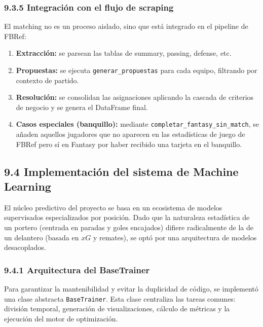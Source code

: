 \subsubsection{9.3.5 Integración con el flujo de scraping}
 
El matching no es un proceso aislado, sino que está integrado en el pipeline de FBRef:
 
\begin{enumerate}
\item \textbf{Extracción:} se parsean las tablas de summary, passing, defense, etc.
 
\item \textbf{Propuestas:} se ejecuta \texttt{generar\_propuestas} para cada equipo, filtrando por contexto de partido.
 
\item \textbf{Resolución:} se consolidan las asignaciones aplicando la cascada de criterios de negocio y se genera el DataFrame final.
 
\item \textbf{Casos especiales (banquillo):} mediante \texttt{completar\_fantasy\_sin\_match}, se añaden aquellos jugadores que no aparecen en las estadísticas de juego de FBRef pero sí en Fantasy por haber recibido una tarjeta en el banquillo.
\end{enumerate}
 
\subsection{9.4 Implementación del sistema de Machine Learning}
 
El núcleo predictivo del proyecto se basa en un ecosistema de modelos supervisados especializados por posición. Dado que la naturaleza
estadística de un portero (centrada en paradas y goles encajados) difiere radicalmente de la de un delantero (basada en $xG$ y remates),
se optó por una arquitectura de modelos desacoplados.
 
\subsubsection{9.4.1 Arquitectura del BaseTrainer}
 
Para garantizar la mantenibilidad y evitar la duplicidad de código, se
implementó una clase abstracta \texttt{BaseTrainer}. Esta clase centraliza las
tareas comunes: división temporal, generación de visualizaciones, cálculo de
métricas y la ejecución del motor de optimización.
 
